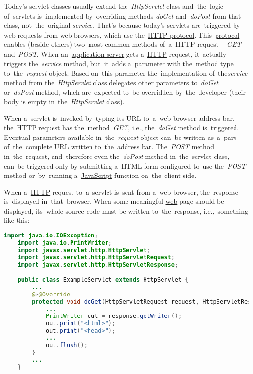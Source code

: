\label{servicedopostdoget}
 Today's servlet classes usually extend the~\textit{HttpServlet} class and~the~logic of~servlets is~implemented by~overriding methods \textit{doGet} and~\textit{doPost} from that class, not~the~original \textit{service}.
That's because today's servlets are~triggered by web requests from web browsers, which use the~\hyperref[http]{HTTP protocol}.
This~\hyperref[protocolstandard]{protocol} enables (beside others) two~most common methods of~a~HTTP request -- \textit{GET} and~\textit{POST}.
When an~\hyperref[applicationserver]{application server} gets a~\hyperref[http]{HTTP} request, it~actually triggers the~\textit{service} method, but~it~adds a~parameter with the~method type to~the~\textit{request} object.
Based on~this parameter the~implementation of~the\textit{service} method from the~\textit{HttpServlet} class delegates other parameters to~\textit{doGet} or~\textit{doPost} method, which are~expected to~be overridden by~the~developer (their body is empty in~the~\textit{HttpServlet} class).

When a~servlet is~invoked by~typing its URL to~a~web browser address bar, the~\hyperref[http]{HTTP} request has the~method~\textit{GET}, i.e., the~\textit{doGet} method is~triggered.
Eventual parameters available in~the~\textit{request} object can~be written as~a~part of~the~complete URL written to~the~address bar.
The~\textit{POST} method in~the~request, and~therefore even the~\textit{doPost} method in~the~servlet class, can~be triggered only by submitting a~HTML form configured to~use the~\textit{POST} method or~by~running a~\hyperref[javascript]{JavaScript} function on~the~client side.

\label{jsp}
When a~\hyperref[http]{HTTP} request to~a~servlet is~sent from a~web browser, the~response is~displayed in~that~browser.
When some meaningful \hyperref[internetweb]{web} page should be displayed, its~whole source code must be written to~the~response, i.e.,~something like this:

\begin{lstlisting}[language=Java]
    import java.io.IOException;
    import java.io.PrintWriter;
    import javax.servlet.http.HttpServlet;
    import javax.servlet.http.HttpServletRequest;
    import javax.servlet.http.HttpServletResponse;

    public class ExampleServlet extends HttpServlet {
        ...
        @>@Override
        protected void doGet(HttpServletRequest request, HttpServletResponse response) throws IOException {
            ...
            PrintWriter out = response.getWriter();
            out.print("<html>");
            out.print("<head>");
            ...
            out.flush();
        }
        ...
    }
\end{lstlisting}

